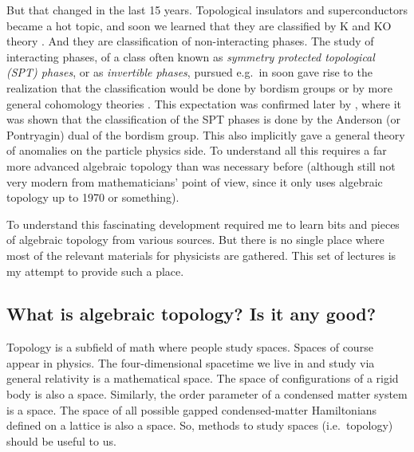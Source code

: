 \documentclass[12pt]{article}
\numberwithin{equation}{section}
\numberwithin{figure}{section}
\theoremstyle{remark}
\begin{document}
But that changed in the last 15 years. 
Topological insulators and superconductors became a hot topic,
and soon we learned that they are classified by K and KO theory \cite{Schnyder:2008tya,Kitaev:2009mg,Ryu:2010zza}.
And they are classification of non-interacting phases.
The study of interacting phases, of a class often known as \emph{symmetry protected topological (SPT) phases},
or as \emph{invertible phases}, 
pursued e.g.~in \cite{Fidkowski:2009dba,Chen:2011pg,Gu:2012ib,Metlitski:2014xqa} 
soon gave rise to the realization that the classification would be done by bordism groups \cite{Kapustin:2014dxa}
or by more general cohomology theories \cite{KitaevCollapse}.
This expectation was confirmed later by \cite{Freed:2016rqq,Yonekura:2018ufj},
where it was shown that the classification of the SPT phases is done by 
the Anderson (or Pontryagin) dual of the bordism group.
This also implicitly gave a general theory of anomalies on the particle physics side.
To understand all this requires a far more advanced algebraic topology than was necessary before
(although still not very modern from mathematicians' point of view, 
since it only uses algebraic topology up to 1970 or something).

To understand this fascinating development required me to learn bits and pieces of algebraic topology 
from various sources. But there is no single place where most of the relevant materials for physicists
are gathered. 
This set of lectures is my attempt to provide such a place.

\subsection{What is algebraic topology? Is it any good?}

Topology is a subfield of math where people study spaces.
Spaces of course appear in physics. 
The four-dimensional spacetime we live in and study via general relativity is a mathematical space.
The space of configurations of a rigid body is also a space.
Similarly, the order parameter of a condensed matter system is a space.
The space of all possible gapped condensed-matter Hamiltonians defined on a lattice 
is also a space.
So, methods to study spaces (i.e.~topology) should be useful to us.
\end{document}
